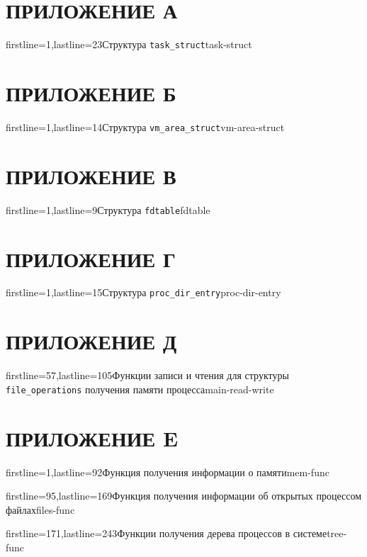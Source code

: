 \chapter*{ПРИЛОЖЕНИЕ А} \label{appendices:a}

        {firstline=1,lastline=23}{Структура \texttt{task\_struct}}{task-struct}{}


\chapter*{ПРИЛОЖЕНИЕ Б} \label{appendices:b}

        {firstline=1,lastline=14}{Структура \texttt{vm\_area\_struct}}{vm-area-struct}{}


\chapter*{ПРИЛОЖЕНИЕ В} \label{appendices:c}

        {firstline=1,lastline=9}{Структура \texttt{fdtable}}{fdtable}{}


\chapter*{ПРИЛОЖЕНИЕ Г} \label{appendices:d}

        {firstline=1,lastline=15}{Структура \texttt{proc\_dir\_entry}}{proc-dir-entry}{}       


\chapter*{ПРИЛОЖЕНИЕ Д} \label{appendices:e}

        {firstline=57,lastline=105}{Функции записи и чтения для структуры \texttt{file\_operations} получения памяти процесса}{main-read-write}{}


\chapter*{ПРИЛОЖЕНИЕ E} \label{appendices:f}

        {firstline=1,lastline=92}{Функция получения информации о памяти}{mem-func}{}

        {firstline=95,lastline=169}{Функция получения информации об открытых процессом файлах}{files-func}{}

        {firstline=171,lastline=243}{Функции получения дерева процессов в системе}{tree-func}{}
